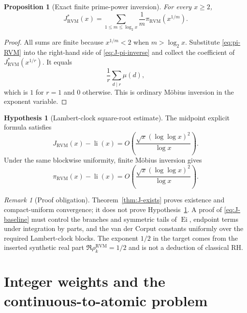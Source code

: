 \documentclass[11pt,reqno]{amsart}
\newtheorem{proposition}[theorem]{Proposition}
\theoremstyle{definition}
\newtheorem{hypothesis}[theorem]{Hypothesis}
\theoremstyle{remark}
\newtheorem{remark}[theorem]{Remark}
\newcommand{\li}{\operatorname{li}}
\newcommand{\Ei}{\operatorname{Ei}}
\newcommand{\RVM}{\mathrm{RVM}}
\begin{document}
\begin{proposition}[Exact finite prime-power inversion]\label{prop:finite-inversion}
For every $x\ge2$,
\begin{equation}\label{eq:J-pi-inverse}
 \boxed{
 J_{\RVM}^{*}(x)
 =\sum_{1\le m\le\log_2x}\frac1m\pi_{\RVM}(x^{1/m}).}
\end{equation}
\end{proposition}

\begin{proof}
All sums are finite because $x^{1/m}<2$ when $m>\log_2x$.  Substitute \eqref{eq:pi-RVM} into the right-hand side of \eqref{eq:J-pi-inverse} and collect the coefficient of $J_{\RVM}^{*}(x^{1/r})$.  It equals
\[
 \frac1r\sum_{d\mid r}\mu(d),
\]
which is $1$ for $r=1$ and $0$ otherwise.  This is ordinary M\"obius inversion in the exponent variable.
\end{proof}

\begin{hypothesis}[Lambert-clock square-root estimate]\label{hyp:Lambert-estimate}
The midpoint explicit formula satisfies
\begin{equation}\label{eq:J-baseline}
 J_{\RVM}(x)-\li(x)
 =O\!\left(\frac{\sqrt x(\log\log x)^2}{\log x}\right).
\end{equation}
Under the same blockwise uniformity, finite M\"obius inversion gives
\begin{equation}\label{eq:pi-baseline}
 \pi_{\RVM}(x)-\li(x)
 =O\!\left(\frac{\sqrt x(\log\log x)^2}{\log x}\right).
\end{equation}
\end{hypothesis}

\begin{remark}[Proof obligation]
Theorem~\ref{thm:J-exists} proves existence and compact-uniform convergence; it does not prove Hypothesis~\ref{hyp:Lambert-estimate}.  A proof of \eqref{eq:J-baseline} must control the branches and symmetric tails of $\Ei$, endpoint terms under integration by parts, and the van der Corput constants uniformly over the required Lambert-clock blocks.  The exponent $1/2$ in the target comes from the inserted synthetic real part $\Re\rho_k^{\RVM}=1/2$ and is not a deduction of classical RH.
\end{remark}

\section{Integer weights and the continuous-to-atomic problem}
\end{document}
